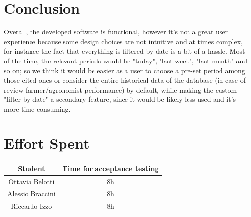 \documentclass[table, 12pt]{article}
\begin{document}
\section{Conclusion}
Overall, the developed software is functional, however it's not a great user experience because some design choices are not intuitive and at times complex, for instance the fact that everything is filtered by date is a bit of a hassle. Most of the time, the relevant periods would be "today", "last week", "last month" and so on; so we think it would be easier as a user to choose a pre-set period among those cited ones or consider the entire historical data of the database (in case of review farmer/agronomist performance) by default, while making the custom "filter-by-date" a secondary feature, since it would be likely less used and it's more time consuming. 



\section{Effort Spent}
\begin{tabular}{|c||c|}
    \hline
    Student & Time for acceptance testing\\ \hline
    Ottavia Belotti & 8h \\
    Alessio Braccini & 8h\\
    Riccardo Izzo & 8h \\
    \hline
\end{tabular}
\end{document}
